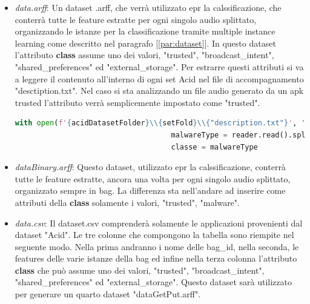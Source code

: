 \begin{itemize}
    \item \textit{data.arff}: Un dataset .arff, che verrà utilizzato epr la calssificazione, che conterrà tutte le feature estratte per ogni singolo audio splittato, organizzando le istanze per la classificazione tramite multiple instance learning come descritto nel paragrafo [\ref{par:dataset}]. In questo dataset l'attributo \textbf{class} assume uno dei valori, "trusted", "broadcast\_intent", "shared\_preferences" ed "external\_storage". Per estrarre questi attributi si va a leggere il contenuto all'interno di ogni set Acid nel file di accompagnamento "desctiption.txt". Nel caso si sta analizzando un file audio generato da un apk trusted l'attributo verrà semplicemente impostato come "trusted".
    \begin{lstlisting}[language=Python, caption=Get android resources, label = lst:getREs]
     with open(f'{acidDatasetFolder}\\{setFold}\\{"description.txt"}', 'r') as reader:
                                    malwareType = reader.read().split(":")[1]
                                    classe = malwareType
    \end{lstlisting}
    \item \textit{dataBinary.arff}: Questo dataset, utilizzato epr la calssificazione, conterrà tutte le feature estratte, ancora una volta per ogni singolo audio splittato, organizzato sempre in bag. La differenza sta nell'andare ad inserire come attributi della \textbf{class} solamente i valori, "trusted", "malware".
    \item \textit{data.csv}: Il dataset.csv comprenderà solamente le applicazioni provenienti dal dataset "Acid". Le tre colonne che compongono la tabella sono riempite nel seguente modo. Nella prima andranno i nome delle bag\_id, nella seconda, le features delle varie istanze della bag ed infine nella terza colonna l'attributo \textbf{class} che può assume uno dei valori, "trusted", "broadcast\_intent", "shared\_preferences" ed "external\_storage". Questo dataset sarà utilizzato per generare un quarto dataset "dataGetPut.arff". 
\end{itemize}

